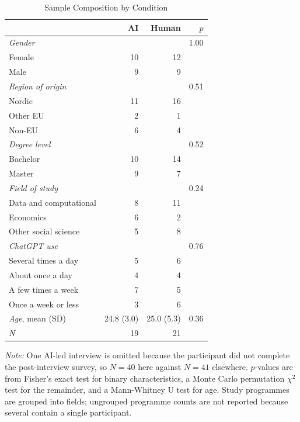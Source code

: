 \documentclass[12pt]{article}
\begin{document}
\begin{table}[H]
\centering
\caption{Sample Composition by Condition}
\label{tab:balance}
\begin{tabularx}{\textwidth}{Xrrr}
\toprule
 & \textbf{AI} & \textbf{Human} & \textbf{$p$} \\
\midrule
\textit{Gender} & & & 1.00 \\
\quad Female & 10 & 12 & \\
\quad Male & 9 & 9 & \\
\addlinespace
\textit{Region of origin} & & & 0.51 \\
\quad Nordic & 11 & 16 & \\
\quad Other EU & 2 & 1 & \\
\quad Non-EU & 6 & 4 & \\
\addlinespace
\textit{Degree level} & & & 0.52 \\
\quad Bachelor & 10 & 14 & \\
\quad Master & 9 & 7 & \\
\addlinespace
\textit{Field of study} & & & 0.24 \\
\quad Data and computational & 8 & 11 & \\
\quad Economics & 6 & 2 & \\
\quad Other social science & 5 & 8 & \\
\addlinespace
\textit{ChatGPT use} & & & 0.76 \\
\quad Several times a day & 5 & 6 & \\
\quad About once a day & 4 & 4 & \\
\quad A few times a week & 7 & 5 & \\
\quad Once a week or less & 3 & 6 & \\
\addlinespace
\textit{Age}, mean (SD) & 24.8 (3.0) & 25.0 (5.3) & 0.36 \\
\midrule
\textit{N} & 19 & 21 & \\
\bottomrule
\end{tabularx}
\smallskip
\parbox{\textwidth}{\singlespacing\small \textit{Note:} One AI-led interview is omitted because the
participant did not complete the post-interview survey, so $N = 40$ here
against $N = 41$ elsewhere. $p$-values are from Fisher's exact test for binary
characteristics, a Monte Carlo permutation $\chi^{2}$ test for the remainder,
and a Mann-Whitney U test for age. Study programmes are grouped into fields;
ungrouped programme counts are not reported because several contain a single
participant.}
\end{table}
\end{document}
